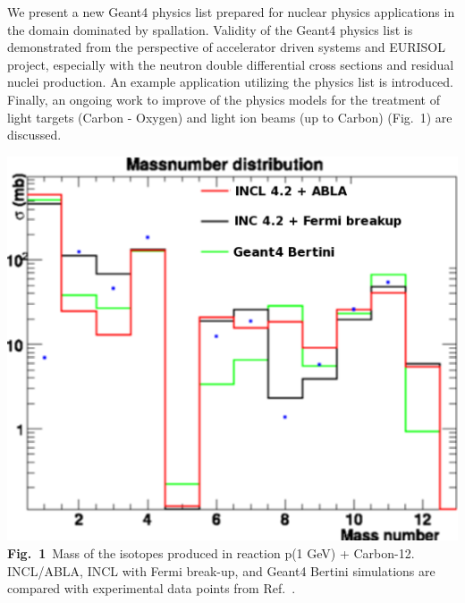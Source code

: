 \documentclass[12pt]{article}
\begin{document}
\begin{minipage}{6cm}
We present a new Geant4 physics list prepared for nuclear physics applications
in the domain dominated by spallation.
Validity of the Geant4 physics list is demonstrated from the perspective of accelerator driven systems
and EURISOL project, especially with the neutron double differential cross sections and residual
nuclei production.
An example application utilizing the physics list is introduced.
%
Finally, an ongoing work to improve of the physics models for the treatment of 
light targets (Carbon - Oxygen) and light ion beams (up to Carbon) (Fig.~1) are discussed.
\end{minipage}
\hfill
\begin{minipage}{8.8cm}
\includegraphics[scale=0.59]{masses2.eps}
{\bf Fig.~1}~Mass of the isotopes produced in reaction p(1 GeV) + Carbon-12.
INCL/ABLA, INCL with Fermi break-up, 
and Geant4 Bertini simulations are compared with experimental data points from Ref.~\cite{carbone}.
\end{minipage}




\end{document}
